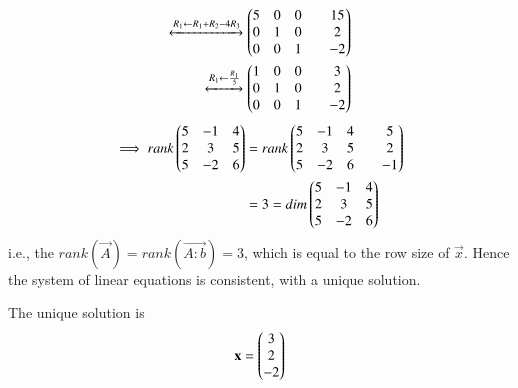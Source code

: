 \documentclass[journal,12pt,twocolumn]{IEEEtran}
\begin{document}
\begin{align}
	\xleftrightarrow[]{R_1 \leftarrow R_1+R_2-4 R_3}
	\begin{pmatrix}5 & 0 &  0 & & 15 \\ 0 & 1 & 0 & & 2 \\ 0 & 0 & 1 & & -2\end{pmatrix}
	\\
	\xleftrightarrow[]{R_1 \leftarrow \frac{R_1}{5}}
	\begin{pmatrix}1 & 0 &  0 & & 3 \\ 0 & 1 & 0 & & 2 \\ 0 & 0 & 1 & & -2\end{pmatrix}
\end{align}
\begin{align}
	\implies rank \begin{pmatrix} 5 & -1 & 4 \\ 2 &  3 & 5 \\ 5 & -2 & 6 \end{pmatrix}
		&=
	rank \begin{pmatrix} 5 & -1 & 4 & & 5 \\ 2 & 3 & 5 & & 2 \\ 5 & -2 & 6 & & -1\end{pmatrix}
		\nonumber \\
	&= 3 = dim \begin{pmatrix} 5 & -1 & 4 \\ 2 &  3 & 5 \\ 5 & -2 & 6 \end{pmatrix}
\end{align}
i.e., the $rank(\vec{A}) = rank(\vec{A:b}) = 3$, which is equal to the row size of $\vec{x}$. Hence the system of linear equations is consistent, with a unique solution. 

The unique solution is 
\begin{align}
	\mathbf{x} = \begin{pmatrix}3\\2\\-2\end{pmatrix}
\end{align}
\end{document}
